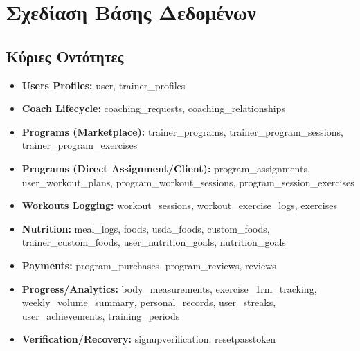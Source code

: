 \documentclass[12pt,a4paper]{report}
\begin{document}
\newpage

\section{Σχεδίαση Βάσης Δεδομένων}

\subsection{Κύριες Οντότητες}
\begin{itemize}[label=•]
    \item \textbf{Users \/ Profiles:} \textenglish{user}, \textenglish{trainer\_profiles}
    \item \textbf{Coach Lifecycle:} \textenglish{coaching\_requests}, \textenglish{coaching\_relationships}
    \item \textbf{Programs (Marketplace):} \textenglish{trainer\_programs}, \textenglish{trainer\_program\_sessions}, \textenglish{trainer\_program\_exercises}
    \item \textbf{Programs (Direct Assignment/Client):} \textenglish{program\_assignments}, \textenglish{user\_workout\_plans}, \textenglish{program\_workout\_sessions}, \textenglish{program\_session\_exercises}
    \item \textbf{Workouts Logging:} \textenglish{workout\_sessions}, \textenglish{workout\_exercise\_logs}, \textenglish{exercises}
    \item \textbf{Nutrition:} \textenglish{meal\_logs}, \textenglish{foods}, \textenglish{usda\_foods}, \textenglish{custom\_foods}, \textenglish{trainer\_custom\_foods}, \textenglish{user\_nutrition\_goals}, \textenglish{nutrition\_goals}
    \item \textbf{Payments:} \textenglish{program\_purchases}, \textenglish{program\_reviews}, \textenglish{reviews}
    \item \textbf{Progress/Analytics:} \textenglish{body\_measurements}, \textenglish{exercise\_1rm\_tracking}, \textenglish{weekly\_volume\_summary}, \textenglish{personal\_records}, \textenglish{user\_streaks}, \textenglish{user\_achievements}, \textenglish{training\_periods}
    \item \textbf{Verification/Recovery:} \textenglish{signupverification}, \textenglish{resetpasstoken}
\end{itemize}
\end{document}
